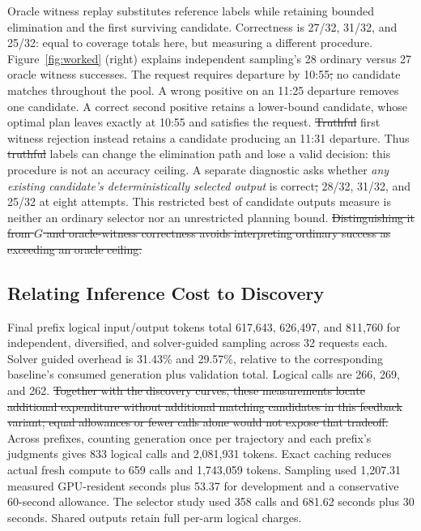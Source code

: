\documentclass[a4paper,twoside]{article}
\providecommand{\DIFaddtex}[1]{{\protect\color{blue}\uwave{#1}}} %
\providecommand{\DIFdeltex}[1]{{\protect\color{red}\sout{#1}}}                      %
\providecommand{\DIFaddbegin}{} %
\providecommand{\DIFaddend}{} %
\providecommand{\DIFdelbegin}{} %
\providecommand{\DIFdelend}{} %
\providecommand{\DIFadd}[1]{\texorpdfstring{\DIFaddtex{#1}}{#1}} %
\providecommand{\DIFdel}[1]{\texorpdfstring{\DIFdeltex{#1}}{}} %
\begin{document}
Oracle witness replay substitutes reference labels while retaining bounded elimination and the first surviving candidate. Correctness is 27/32, 31/32, and 25/32: equal to coverage totals here, but measuring a different procedure.
Figure~\ref{fig:worked} (right) explains independent sampling's 28 ordinary versus 27 oracle witness successes. The request requires departure by 10:55\DIFdelbegin \DIFdel{, }\DIFdelend \DIFaddbegin \DIFadd{; }\DIFaddend no candidate matches throughout the pool. A wrong positive on an 11:25 departure removes one candidate. A correct second positive retains a lower-bound candidate, whose optimal plan leaves exactly at 10:55 and satisfies the request. \DIFdelbegin \DIFdel{Truthful }\DIFdelend \DIFaddbegin \DIFadd{Reference-label }\DIFaddend first witness rejection instead retains a candidate producing an 11:31 departure. Thus \DIFdelbegin \DIFdel{truthful }\DIFdelend \DIFaddbegin \DIFadd{reference }\DIFaddend labels can change the elimination path and lose a valid decision: this procedure is not an accuracy ceiling.
A separate diagnostic asks whether \emph{any existing candidate's deterministically selected output} is correct\DIFdelbegin \DIFdel{,  }\DIFdelend \DIFaddbegin \DIFadd{: }\DIFaddend 28/32, 31/32, and 25/32 at eight attempts. This restricted best of candidate outputs measure is neither an ordinary selector nor an unrestricted planning bound. 
\DIFdelbegin \DIFdel{Distinguishing it from $G$ and oracle-witness correctness avoids interpreting ordinary success as exceeding an oracle ceiling.
}\DIFdelend 

\subsection{Relating Inference Cost to Discovery}

Final prefix logical input/output tokens total 617,643, 626,497, and 811,760 for independent, diversified, and solver-guided sampling across 32 requests each. Solver guided overhead is 31.43\% and 29.57\%, relative to the corresponding baseline's consumed generation plus validation total. Logical calls are 266, 269, and 262. 
\DIFdelbegin \DIFdel{Together with the discovery curves, these measurements locate additional expenditure without additional matching candidates in this feedback variant; equal allowances or fewer calls alone would not expose that tradeoff.
}\DIFdelend Across prefixes, counting generation once per trajectory and each prefix's judgments gives 833 logical calls and 2,081,931 tokens. Exact caching reduces actual fresh compute to 659 calls and 1,743,059 tokens. Sampling used 1,207.31 measured GPU-resident seconds plus 53.37 for development and a conservative 60-second allowance. The selector study used 358 calls and 681.62 seconds plus 30 seconds. Shared outputs retain full per-arm logical charges.
\end{document}
